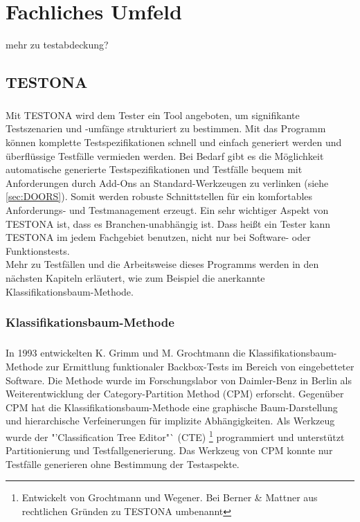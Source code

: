 \chapter{Fachliches Umfeld}\label{chp:fachlichesumfeld}

mehr zu testabdeckung?

\section{TESTONA}\label{sec:Testona} 
\paragraph{}

Mit TESTONA wird dem Tester ein Tool angeboten, um signifikante Testszenarien und -umfänge strukturiert zu bestimmen. Mit das Programm können komplette Testspezifikationen schnell und einfach generiert werden und überflüssige Testfälle vermieden werden. Bei Bedarf gibt es die Möglichkeit automatische generierte Testspezifikationen und Testfälle bequem mit Anforderungen durch Add-Ons an Standard-Werkzeugen zu verlinken (siehe \ref{sec:DOORS}). Somit werden robuste Schnittstellen für ein komfortables Anforderungs- und Testmanagement erzeugt. Ein sehr wichtiger Aspekt von TESTONA ist, dass es Branchen-unabhängig ist. Dass heißt ein Tester kann TESTONA im jedem Fachgebiet benutzen, nicht nur bei Software- oder Funktionstests.\\

Mehr zu Testfällen und die Arbeitsweise dieses Programms werden in den nächsten Kapiteln erläutert, wie zum Beispiel die anerkannte Klassifikationsbaum-Methode.



\subsection{Klassifikationsbaum-Methode}\label{ssec:KM}
\paragraph{}
In 1993 entwickelten K. Grimm und M. Grochtmann die Klassifikationsbaum-Methode zur Ermittlung funktionaler Backbox-Tests im Bereich von eingebetteter Software. Die Methode wurde im Forschungslabor von Daimler-Benz in Berlin als Weiterentwicklung der Category-Partition Method (CPM) erforscht. Gegenüber CPM hat die Klassifikationsbaum-Methode eine graphische Baum-Darstellung und hierarchische Verfeinerungen für implizite Abhängigkeiten. Als Werkzeug wurde der "'Classification Tree Editor"` (CTE) \footnote{Entwickelt von Grochtmann und Wegener\cite{TestCaseDesign}. Bei Berner  \& Mattner aus rechtlichen Gründen zu TESTONA umbenannt} programmiert und unterstützt Partitionierung und Testfallgenerierung. Das Werkzeug von CPM konnte nur Testfälle generieren ohne Bestimmung der Testaspekte\cite{ClassificationTrees}.

